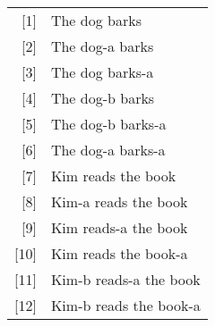 \documentclass[a4paper]{article}
\begin{document}
\begin{tabular}[t]{rl}
{[1]} & The dog barks \\
{[2]} & The dog-a barks \\
{[3]} & The dog barks-a \\
{[4]} & The dog-b barks \\
{[5]} & The dog-b barks-a \\
{[6]} & The dog-a barks-a \\
{[7]} & Kim reads the book \\
{[8]} & Kim-a reads the book \\
{[9]} & Kim reads-a the book \\ 
{[10]} & Kim reads the book-a \\
{[11]} & Kim-b reads-a the book \\
{[12]} & Kim-b reads the book-a \\
\end{tabular}
\end{document}
